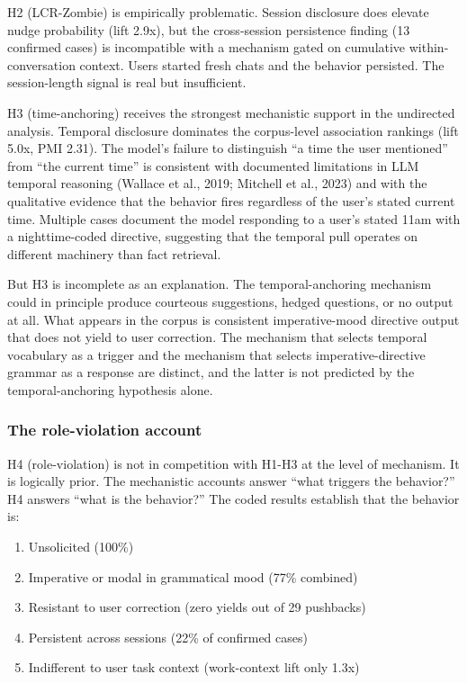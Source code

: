 \documentclass[11pt]{article}
\begin{document}
H2 (LCR-Zombie) is empirically problematic. Session disclosure does elevate nudge probability (lift 2.9x), but the cross-session persistence finding (13 confirmed cases) is incompatible with a mechanism gated on cumulative within-conversation context. Users started fresh chats and the behavior persisted. The session-length signal is real but insufficient.

H3 (time-anchoring) receives the strongest mechanistic support in the undirected analysis. Temporal disclosure dominates the corpus-level association rankings (lift 5.0x, PMI 2.31). The model's failure to distinguish ``a time the user mentioned'' from ``the current time'' is consistent with documented limitations in LLM temporal reasoning (Wallace et al., 2019; Mitchell et al., 2023) and with the qualitative evidence that the behavior fires regardless of the user's stated current time. Multiple cases document the model responding to a user's stated 11am with a nighttime-coded directive, suggesting that the temporal pull operates on different machinery than fact retrieval.

But H3 is incomplete as an explanation. The temporal-anchoring mechanism could in principle produce courteous suggestions, hedged questions, or no output at all. What appears in the corpus is consistent imperative-mood directive output that does not yield to user correction. The mechanism that selects temporal vocabulary as a trigger and the mechanism that selects imperative-directive grammar as a response are distinct, and the latter is not predicted by the temporal-anchoring hypothesis alone.

\subsubsection{The role-violation account}

H4 (role-violation) is not in competition with H1-H3 at the level of mechanism. It is logically prior. The mechanistic accounts answer ``what triggers the behavior?'' H4 answers ``what is the behavior?'' The coded results establish that the behavior is:

\begin{enumerate}[leftmargin=*]
  \item Unsolicited (100\%)
  \item Imperative or modal in grammatical mood (77\% combined)
  \item Resistant to user correction (zero yields out of 29 pushbacks)
  \item Persistent across sessions (22\% of confirmed cases)
  \item Indifferent to user task context (work-context lift only 1.3x)
\end{enumerate}
\end{document}
